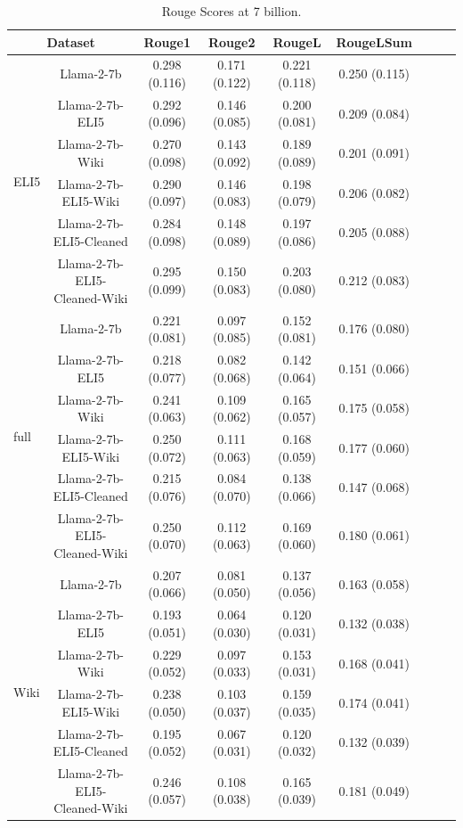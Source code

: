 \documentclass[11pt, oneside]{article}   	%
\begin{document}
\begin{table}[ht]
\centering
\begin{tabular}{lcccccccc}
\toprule
\multicolumn{2}{c}{Dataset} & \multicolumn{1}{c}{Rouge1} & \multicolumn{1}{c}{Rouge2} & \multicolumn{1}{c}{RougeL} & \multicolumn{1}{c}{RougeLSum} \\
\midrule
\multirow{6}{*}{ELI5} & Llama-2-7b & 0.298 (0.116) & 0.171 (0.122) & 0.221 (0.118) & 0.250 (0.115) \\
& Llama-2-7b-ELI5 & 0.292 (0.096) & 0.146 (0.085) & 0.200 (0.081) & 0.209 (0.084) \\
& Llama-2-7b-Wiki & 0.270 (0.098) & 0.143 (0.092) & 0.189 (0.089) & 0.201 (0.091) \\
& Llama-2-7b-ELI5-Wiki & 0.290 (0.097) & 0.146 (0.083) & 0.198 (0.079) & 0.206 (0.082) \\
& Llama-2-7b-ELI5-Cleaned & 0.284 (0.098) & 0.148 (0.089) & 0.197 (0.086) & 0.205 (0.088) \\
& Llama-2-7b-ELI5-Cleaned-Wiki & 0.295 (0.099) & 0.150 (0.083) & 0.203 (0.080) & 0.212 (0.083) \\
\midrule
\multirow{6}{*}{full} & Llama-2-7b & 0.221 (0.081) & 0.097 (0.085) & 0.152 (0.081) & 0.176 (0.080) \\
& Llama-2-7b-ELI5 & 0.218 (0.077) & 0.082 (0.068) & 0.142 (0.064) & 0.151 (0.066) \\
& Llama-2-7b-Wiki & 0.241 (0.063) & 0.109 (0.062) & 0.165 (0.057) & 0.175 (0.058) \\
& Llama-2-7b-ELI5-Wiki & 0.250 (0.072) & 0.111 (0.063) & 0.168 (0.059) & 0.177 (0.060) \\
& Llama-2-7b-ELI5-Cleaned & 0.215 (0.076) & 0.084 (0.070) & 0.138 (0.066) & 0.147 (0.068) \\
& Llama-2-7b-ELI5-Cleaned-Wiki & 0.250 (0.070) & 0.112 (0.063) & 0.169 (0.060) & 0.180 (0.061) \\
\midrule
\multirow{6}{*}{Wiki} & Llama-2-7b & 0.207 (0.066) & 0.081 (0.050) & 0.137 (0.056) & 0.163 (0.058) \\
& Llama-2-7b-ELI5 & 0.193 (0.051) & 0.064 (0.030) & 0.120 (0.031) & 0.132 (0.038) \\
& Llama-2-7b-Wiki & 0.229 (0.052) & 0.097 (0.033) & 0.153 (0.031) & 0.168 (0.041) \\
& Llama-2-7b-ELI5-Wiki & 0.238 (0.050) & 0.103 (0.037) & 0.159 (0.035) & 0.174 (0.041) \\
& Llama-2-7b-ELI5-Cleaned & 0.195 (0.052) & 0.067 (0.031) & 0.120 (0.032) & 0.132 (0.039) \\
& Llama-2-7b-ELI5-Cleaned-Wiki & 0.246 (0.057) & 0.108 (0.038) & 0.165 (0.039) & 0.181 (0.049) \\
\bottomrule
\end{tabular}
\caption{Rouge Scores at 7 billion.}
\label{tab:rouge_scores_7B}
\end{table}
\end{document}
